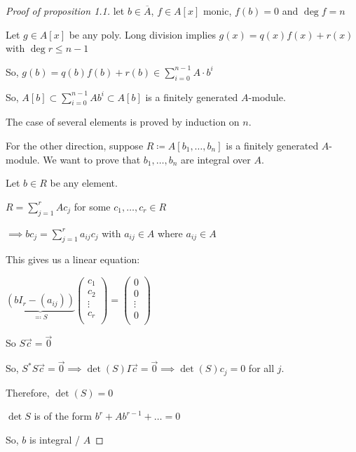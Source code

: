 \documentclass[openany]{amsbook}
\numberwithin{section}{chapter}
\theoremstyle{definition}
\begin{document}
\begin{proof}
    [Proof of proposition 1.1] let \(b\in \overline{A}\), \(f\in A[x]\) monic, \(f(b)=0\) and \(\deg f = n\) 

    Let \(g\in A[x]\) be any poly. Long division implies \(g(x) = q(x) f(x) + r(x)\) with \(\deg r \leq  n-1\) 

    So, \(g(b) = q(b)f(b) + r(b) \in \sum_{i=0}^{n-1} A \cdot b^i \)
    
    So, \(A[b] \subset \sum_{i=0}^{n-1} A b^i \subset A[b] \) is a finitely generated \(A\)-module. 
    
    The case of several elements is proved by induction on \(n\).

    For the other direction, suppose \(R \coloneqq A[b_1, \dots , b_n]\) is a finitely generated \(A\)-module. We want to prove that \(b_1, \dots , b_n\) are integral over \(A\).

    Let \(b\in R\) be any element.

    \(R = \sum_{j=1}^{r} A c_j\) for some \(c_1, \dots , c_r \in R\) 

    \(\implies bc_j = \sum_{j=1}^{r} a_{ij} c_j\) with \(a_{ij}\in A\) where \(a_{ij}\in A\) 

    This gives us a linear equation:

    \(\underbrace{(bI_r - (a_{ij}))}_{\eqqcolon S}\begin{pmatrix}
         c_1 \\
         c_2 \\
         \vdots  \\
         c_r \\
    \end{pmatrix} = \begin{pmatrix}
         0 \\
         0 \\
         \vdots \\
         0 \\
    \end{pmatrix}\) 
    
    So \(S \vec{c} = \vec{0}\) 

    So, \(S^{\ast} S \vec{c} = \vec{0} \implies \det(S) I \vec{c} = \vec{0} \implies \det(S)c_j = 0\) for all \(j\).

    Therefore, \(\det(S)=0\) 

    \(\det S\) is of the form \(b^r + Ab^{r-1} + \dots = 0\) 

    So, \(b\) is integral / \(A\) 

\end{proof}
\end{document}
